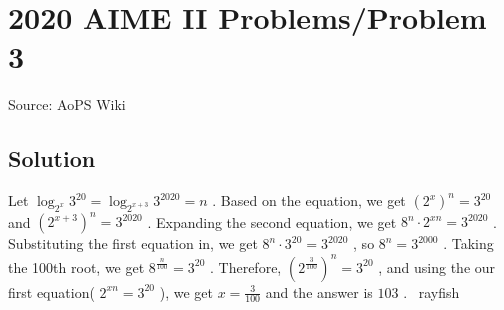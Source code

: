\documentclass[12pt]{article}
\begin{document}
\section*{{2020 AIME II Problems/Problem 3}}
Source: AoPS Wiki

\subsection*{Solution}
Let $\log _{2^x}3^{20}=\log _{2^{x+3}}3^{2020}=n$ . Based on the equation, we get $(2^x)^n=3^{20}$ and $(2^{x+3})^n=3^{2020}$ . Expanding the second equation, we get $8^n\cdot2^{xn}=3^{2020}$ . Substituting the first equation in, we get $8^n\cdot3^{20}=3^{2020}$ , so $8^n=3^{2000}$ . Taking the 100th root, we get $8^{\frac{n}{100}}=3^{20}$ . Therefore, $(2^{\frac{3}{100}})^n=3^{20}$ , and using the our first equation( $2^{xn}=3^{20}$ ), we get $x=\frac{3}{100}$ and the answer is $\boxed{103}$ .
~rayfish
\end{document}
